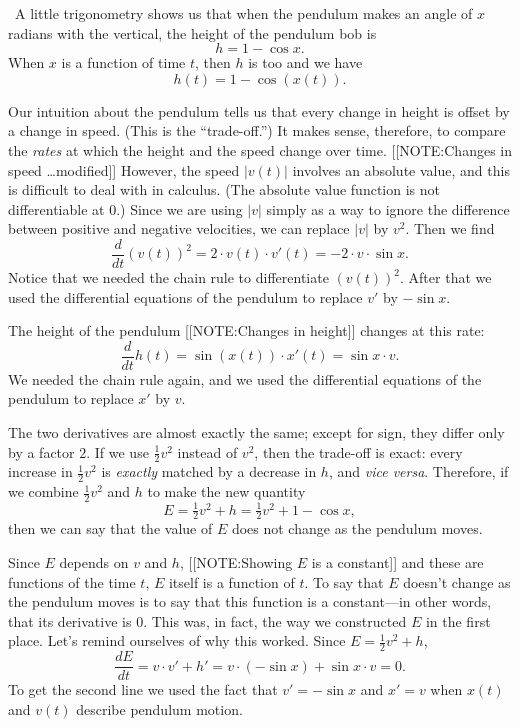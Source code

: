 

\quad \ A little trigonometry shows us that when the pendulum makes an
angle of $x$ radians with the vertical, the height of the pendulum bob
is
	\[
h = 1 - \cos{x}.
\]
When $x$ is a function of time $t$, then $h$ is too and we have
	\[
h(t) = 1 - \cos(x(t)).
\]


Our intuition about the pendulum tells us that every change in height
is offset by a change in speed.  (This is the ``trade-off.'')  It
makes sense, therefore, to compare the {\em rates\/} at which the
height and the speed change over time.
[[NOTE:Changes in speed \ldots modified]]
However, the speed $|v(t)|$ involves an absolute value, and this is
difficult to deal with in calculus.  (The absolute value function is
not differentiable at 0.)  Since we are using $|v|$ simply as a way to
ignore the difference between positive and negative velocities, we can
replace $|v|$ by $v^2$.  Then we find
	\[
\dfrac{d}{dt} (v(t))^2 = 2 \cdot v(t) \cdot v'(t) = 
		-2 \cdot v \cdot \sin{x}.
\]
Notice that we needed the chain rule to differentiate $(v(t))^2$.
After that we used the differential equations of the pendulum to
replace $v'$ by $-\sin{x}$.


	The height of the pendulum 
	[[NOTE:Changes in height]]	
changes at this rate:
	\[
\dfrac{d}{dt} h(t) = \sin(x(t)) \cdot x'(t) = \sin{x} \cdot v.
\]
We needed the chain rule again, and we used the differential equations
of the pendulum to replace $x'$ by $v$.

The two derivatives are almost exactly the same; except for sign, they
differ only by a factor $2$.  If we use $\tfrac{1}{2} v^2$ instead of
$v^2$, then the trade-off is exact: every increase in $\tfrac{1}{2}
v^2$ is {\em exactly\/} matched by a decrease in $h$, and {\em vice
  versa}.  Therefore, if we combine $\tfrac{1}{2} v^2$ and $h$ to make
the new quantity\label{pend}
	\[
E = \tfrac{1}{2} v^2  + h = 
		\tfrac{1}{2} v^2  +  1 - \cos{x},
\]
then we can say that the value of $E$ does not change as the pendulum
moves.

\enlargethispage*{25pt}  
Since $E$ depends on $v$ and $h$, 
[[NOTE:Showing $E$ is a constant]]	
and these are functions of the time $t$, $E$ itself is a function of
$t$.  To say that $E$ doesn't change as the pendulum moves is to say
that this function is a constant---in other words, that its derivative
is 0.  This was, in fact, the way we constructed $E$ in the first
place.  Let's remind ourselves of why this worked.  Since $E =
\tfrac{1}{2} v^2 + h$,
\[
\dfrac{dE}{dt} = v \cdot v' + h'
     = v \cdot (-\sin{x}) + \sin{x} \cdot v = 0.
\]
To get the second line we used the fact that $v' = -\sin{x}$ and $x' =
v$ when $x(t)$ and $v(t)$ describe pendulum motion.

